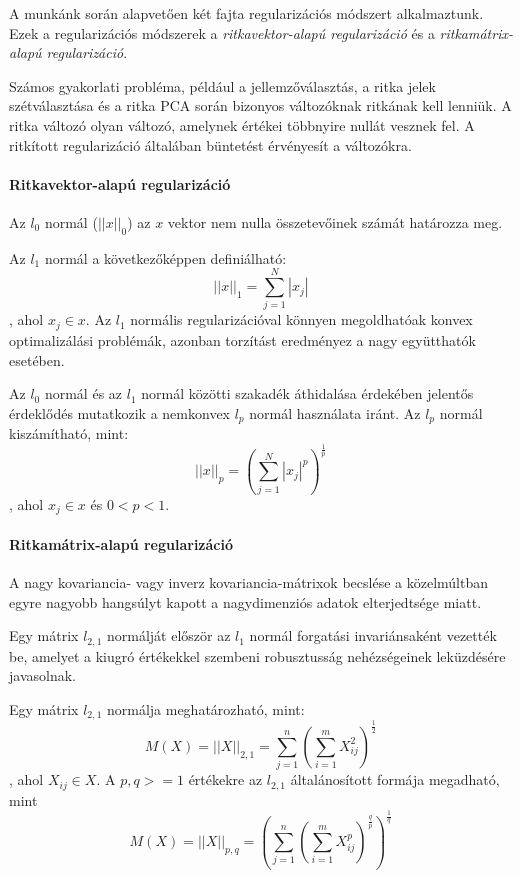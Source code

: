 \documentclass[12pt,a4]{article}
\begin{document}
        A munkánk során alapvetően két fajta regularizációs módszert alkalmaztunk. Ezek a regularizációs  módszerek a \textit{ritkavektor-alapú regularizáció} és a \textit{ritkamátrix-alapú regularizáció}.

        Számos gyakorlati probléma, például a jellemzőválasztás, a ritka jelek szétválasztása és a ritka PCA során bizonyos változóknak ritkának kell lenniük. A ritka változó olyan változó, amelynek értékei többnyire nullát vesznek fel. A ritkított regularizáció általában büntetést érvényesít a változókra.
        
        \paragraph{Ritkavektor-alapú regularizáció}
        Az $l_{0}$ normál ($|| x ||_{0}$) az $x$ vektor nem nulla összetevőinek számát határozza meg.
        
        Az $l_{1}$ normál a következőképpen definiálható:
        \begin{equation}
            ||x||_{1} = \sum_{j=1}^{N}|x_{j}|
        \end{equation}
        , ahol $x_{j} \in x$. Az $l_{1}$ normális regularizációval könnyen megoldhatóak konvex optimalizálási problémák, azonban torzítást eredményez a nagy együtthatók esetében.

        Az $l_{0}$ normál és az $l_{1}$ normál közötti szakadék áthidalása érdekében jelentős érdeklődés mutatkozik a nemkonvex $l_{p}$ normál használata iránt. Az $l_{p}$ normál kiszámítható, mint:
        \begin{equation}
            || x ||_{p} = (\sum_{j = 1}^{N}|x_{j}|^{p})^{\frac{1}{p}}
        \end{equation}
        , ahol $x_{j} \in x$ és $0 < p < 1$. 

        
        \paragraph{Ritkamátrix-alapú regularizáció}
        A nagy kovariancia- vagy inverz kovariancia-mátrixok becslése a közelmúltban egyre nagyobb hangsúlyt kapott a nagydimenziós adatok elterjedtsége miatt.

        Egy mátrix $l_{2,1}$ normálját először az $l_{1}$ normál forgatási invariánsaként vezették be, amelyet a kiugró értékekkel szembeni robusztusság nehézségeinek leküzdésére javasolnak.

        Egy mátrix $l_{2,1}$ normálja meghatározható, mint:
        \begin{equation}
            M(X) = ||X||_{2,1} = \sum_{j=1}^{n}(\sum_{i=1}^{m}X_{ij}^{2})^{\frac{1}{2}}
        \end{equation}
        , ahol $X_{ij} \in X$. A $p,q>=1$ értékekre az $l_{2,1}$ általánosított formája megadható, mint
        \begin{equation}
            M(X) = ||X||_{p,q} = (\sum_{j=1}^{n}(\sum_{i=1}^{m}X_{ij}^{p})^{\frac{q}{p}})^{\frac{1}{q}}
        \end{equation}
    
\end{document}
